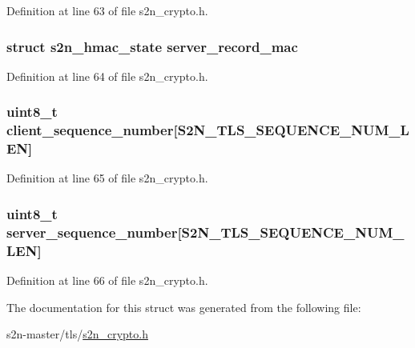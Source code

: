 Definition at line 63 of file s2n\+\_\+crypto.\+h.

\subsubsection[{\texorpdfstring{server\+\_\+record\+\_\+mac}{server_record_mac}}]{\setlength{\rightskip}{0pt plus 5cm}struct {\bf s2n\+\_\+hmac\+\_\+state} server\+\_\+record\+\_\+mac}\hypertarget{structs2n__crypto__parameters_a2d6bba69a948270d25b1e24876225224}{}\label{structs2n__crypto__parameters_a2d6bba69a948270d25b1e24876225224}


Definition at line 64 of file s2n\+\_\+crypto.\+h.

\subsubsection[{\texorpdfstring{client\+\_\+sequence\+\_\+number}{client_sequence_number}}]{\setlength{\rightskip}{0pt plus 5cm}uint8\+\_\+t client\+\_\+sequence\+\_\+number\mbox{[}{\bf S2\+N\+\_\+\+T\+L\+S\+\_\+\+S\+E\+Q\+U\+E\+N\+C\+E\+\_\+\+N\+U\+M\+\_\+\+L\+EN}\mbox{]}}\hypertarget{structs2n__crypto__parameters_ab7767b5b58441b15ac1028ac18b06ef1}{}\label{structs2n__crypto__parameters_ab7767b5b58441b15ac1028ac18b06ef1}


Definition at line 65 of file s2n\+\_\+crypto.\+h.

\subsubsection[{\texorpdfstring{server\+\_\+sequence\+\_\+number}{server_sequence_number}}]{\setlength{\rightskip}{0pt plus 5cm}uint8\+\_\+t server\+\_\+sequence\+\_\+number\mbox{[}{\bf S2\+N\+\_\+\+T\+L\+S\+\_\+\+S\+E\+Q\+U\+E\+N\+C\+E\+\_\+\+N\+U\+M\+\_\+\+L\+EN}\mbox{]}}\hypertarget{structs2n__crypto__parameters_a286710aff413808336b2f294554c7e55}{}\label{structs2n__crypto__parameters_a286710aff413808336b2f294554c7e55}


Definition at line 66 of file s2n\+\_\+crypto.\+h.



The documentation for this struct was generated from the following file\+:\begin{DoxyCompactItemize}
\item 
s2n-\/master/tls/\hyperlink{tls_2s2n__crypto_8h}{s2n\+\_\+crypto.\+h}\end{DoxyCompactItemize}

